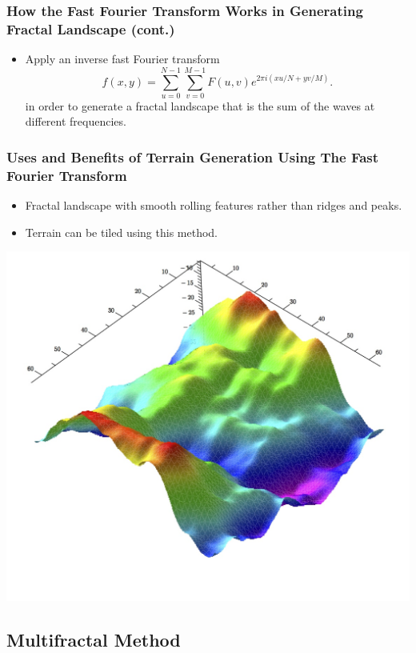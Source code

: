\documentclass{beamer}
\begin{document}
\begin{frame}
\frametitle{How the Fast Fourier Transform Works in Generating Fractal Landscape (cont.)}
\begin{itemize}
\item Apply an inverse fast Fourier transform
$$f(x,y)=\displaystyle\sum\limits_{u=0}^{N-1} \displaystyle\sum\limits_{v=0}^{M-1} F(u,v)e^{2\pi i(xu/N+yv/M)}.$$ 
in order to generate a fractal landscape that is the sum of the waves at different frequencies. 
\end{itemize}
\end{frame}

\begin{frame}
\frametitle{Uses and Benefits of Terrain Generation Using The Fast Fourier Transform}
\begin{itemize}
\item Fractal landscape with smooth rolling features rather than ridges and peaks.
\item Terrain can be tiled using this method.
\end{itemize}
\begin{center}
\includegraphics[scale=0.3]{FourierLandscape.jpg}

\end{center}
\end{frame}

\subsection{Multifractal Method}
\end{document}
